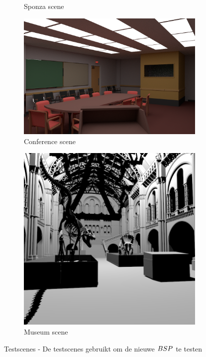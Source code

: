 \begin{figure}
\begin{subfigure}[t]{0.20\textwidth}
    \caption{Sponza scene}
    \label{fig:results-scene-sponza}    
  \end{subfigure}
  \begin{subfigure}[t]{0.29\textwidth}
    \centering
    \includegraphics[width=1\linewidth]{img/conferencehall}
    \caption{Conference scene}
    \label{fig:results-scene-conference}    
  \end{subfigure}
  \begin{subfigure}[t]{0.20\textwidth}
    \centering
    \includegraphics[width=1\linewidth]{img/museum}
    \caption{Museum scene}
    \label{fig:results-scene-museum}    
  \end{subfigure}
  \caption[Testscenes]{Testscenes - \small De testscenes gebruikt om de nieuwe $BSP$ te testen}
  \label{fig:results-scenes}
\end{figure}

